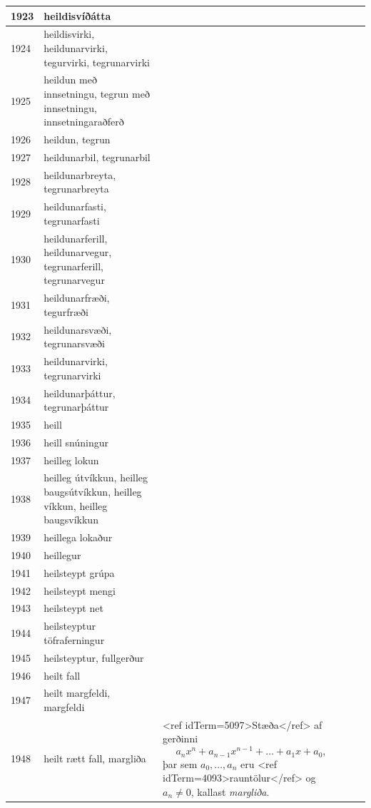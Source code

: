 \begin{longtable}{p{}|p{}|p{}|p{}|p{}}
\hline
1923 & heildisvíðátta &  &  &  \\
\hline
1924 & heildisvirki, heildunarvirki, tegurvirki, tegrunarvirki &  &  &  \\
\hline
1925 & heildun með innsetningu, tegrun með innsetningu, innsetningaraðferð &  &  &  \\
\hline
1926 & heildun, tegrun &  &  &  \\
\hline
1927 & heildunarbil, tegrunarbil &  &  &  \\
\hline
1928 & heildunarbreyta, tegrunarbreyta &  &  &  \\
\hline
1929 & heildunarfasti, tegrunarfasti &  &  &  \\
\hline
1930 & heildunarferill, heildunarvegur, tegrunarferill, tegrunarvegur &  &  &  \\
\hline
1931 & heildunarfræði, tegurfræði &  &  &  \\
\hline
1932 & heildunarsvæði, tegrunarsvæði &  &  &  \\
\hline
1933 & heildunarvirki, tegrunarvirki &  &  &  \\
\hline
1934 & heildunarþáttur, tegrunarþáttur &  &  &  \\
\hline
1935 & heill &  &  &  \\
\hline
1936 & heill snúningur &  &  &  \\
\hline
1937 & heilleg lokun &  &  &  \\
\hline
1938 & heilleg útvíkkun, heilleg baugsútvíkkun, heilleg víkkun, heilleg baugsvíkkun &  &  &  \\
\hline
1939 & heillega lokaður &  &  &  \\
\hline
1940 & heillegur &  &  &  \\
\hline
1941 & heilsteypt grúpa &  &  &  \\
\hline
1942 & heilsteypt mengi &  &  &  \\
\hline
1943 & heilsteypt net &  &  &  \\
\hline
1944 & heilsteyptur töfraferningur &  &  &  \\
\hline
1945 & heilsteyptur, fullgerður &  &  &  \\
\hline
1946 & heilt fall &  &  &  \\
\hline
1947 & heilt margfeldi, margfeldi &  &  &  \\
\hline
1948 & heilt rætt fall, margliða & <ref idTerm=5097>Stæða</ref> af gerðinni \[a_{n}x^n + a_{n-1}x^{n-1} + \ldots + a_{1}x + a_{0},\] þar sem $a_{0},\ldots,a_{n}$ eru <ref idTerm=4093>rauntölur</ref> og $a_{n} \neq 0$, kallast \textit{margliða}. 


\end{longtable}
